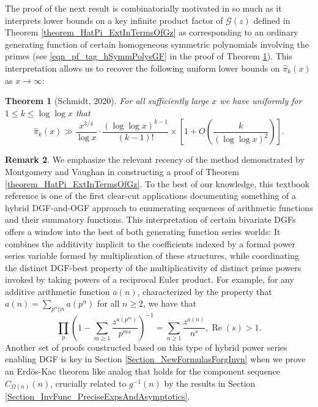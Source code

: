 \documentclass[11pt,reqno,a4letter]{article}
\numberwithin{figure}{section}
\numberwithin{table}{section}
\newcommand{\cf}{\textit{cf.\ }}
\theoremstyle{plain}
\newtheorem{theorem}{Theorem}
\numberwithin{theorem}{section}
\theoremstyle{definition}
\newtheorem{remark}[theorem]{Remark}
\renewcommand{\Re}{\operatorname{Re}}
\begin{document}
The proof of the next result is combinatorially motivated in so much as it interprets 
lower bounds on a key infinite product factor of $\mathcal{G}(z)$ defined in 
Theorem \ref{theorem_HatPi_ExtInTermsOfGz} 
as corresponding to an ordinary generating function of certain 
homogeneous symmetric polynomials involving the primes 
(see \eqref{eqn_pf_tag_hSymmPolysGF} in the proof of 
Theorem \ref{theorem_GFs_SymmFuncs_SumsOfRecipOfPowsOfPrimes}). 
This interpretation allows us to recover the 
following uniform lower bounds on $\widehat{\pi}_k(x)$ as $x \rightarrow \infty$: 

\begin{theorem}[Schmidt, 2020] 
\label{theorem_GFs_SymmFuncs_SumsOfRecipOfPowsOfPrimes} 
\label{cor_BoundsOnGz_FromMVBook_initial_stmt_v1} 
For all sufficiently large $x$ we have uniformly for $1 \leq k \leq \log\log x$ that 
\[
\widehat{\pi}_k(x) \gg 
     \frac{x^{3/4}}{\log x} \cdot 
     \frac{(\log\log x)^{k-1}}{(k-1)!} \times \left[1 + 
     O\left(\frac{k}{(\log\log x)^2}\right)\right]. 
\]
\end{theorem} 

\begin{remark} 
\label{remark_MV_NewDGFApplications} 
We emphasize the relevant recency of the method demonstrated by 
Montgomery and Vaughan in constructing a proof of 
Theorem \ref{theorem_HatPi_ExtInTermsOfGz}. 
To the best of our knowledge, this textbook reference is 
one of the first clear-cut applications documenting something of a hybrid 
DGF-and-OGF approach to enumerating sequences of arithmetic functions 
and their summatory functions. 
This interpretation of certain bivariate DGFs 
offers a window into the best of both generating function series worlds: 
It combines the additivity 
implicit to the coefficients indexed by a formal power series variable formed by 
multiplication of these structures, while coordinating the distinct DGF-best 
property of the multiplicativity of distinct prime powers invoked 
by taking powers of a reciprocal Euler product. 
For example, for any additive arithmetic function $a(n)$, 
characterized by the property that 
$a(n) = \sum_{p^{\alpha} || n} a(p^{\alpha})$ for all $n \geq 2$, we have that 
\cite[\cf \S 1.7]{IWANIEC-KOWALSKI} 
\[
\prod_p \left( 
     1 - \sum_{m \geq 1} \frac{z^{a(p^m)}}{p^{ms}}\right)^{-1} = 
     \sum_{n \geq 1} \frac{z^{a(n)}}{n^s}, \Re(s) > 1. 
\]
Another set of proofs constructed based on this type of hybrid power series enabling 
DGF is key in Section \ref{Section_NewFormulasForgInvn} 
when we prove an Erd\"os-Kac theorem like analog 
that holds for the component sequence $C_{\Omega(n)}(n)$, 
crucially related to $g^{-1}(n)$ by the 
results in Section \ref{Section_InvFunc_PreciseExpsAndAsymptotics}. 
\end{remark} 
\end{document}
